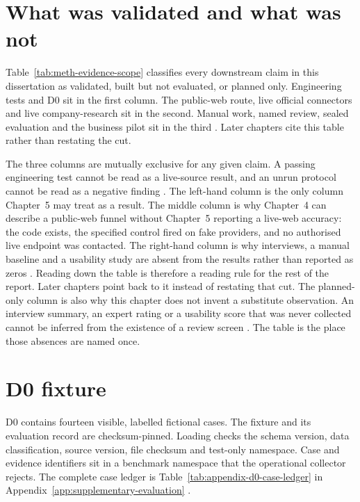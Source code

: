 \section{What was validated and what was not}
\label{sec:evidence-scope}

Table~\ref{tab:meth-evidence-scope} classifies every downstream claim in this dissertation as
validated, built but not evaluated, or planned only. Engineering tests and D0 sit in the first
column. The public-web route, live official connectors and live company-research sit in the second.
Manual work, named review, sealed evaluation and the business pilot sit in the third
\citep{hevner2004design,pineau2021reproducibility}. Later chapters cite this table rather than
restating the cut.



The three columns are mutually exclusive for any given claim. A passing engineering test cannot be
read as a live-source result, and an unrun protocol cannot be read as a negative finding
\citep{hevner2004design,pineau2021reproducibility}. The left-hand column is the only column
Chapter~5 may treat as a result. The middle column is why Chapter~4 can describe a public-web
funnel without Chapter~5 reporting a live-web accuracy: the code exists, the specified control
fired on fake providers, and no authorised live endpoint was contacted. The right-hand column is
why interviews, a manual baseline and a usability study are absent from the results rather than
reported as zeros \citep{kapoor2023leakage,fu2026agents}. Reading down the table is therefore a
reading rule for the rest of the report. Later chapters point back to it instead of restating
that cut. The planned-only column is also why this chapter does not invent a substitute
observation. An interview summary, an expert rating or a usability score that was never
collected cannot be inferred from the existence of a review screen
\citep{amershi2019guidelines,bucinca2021forcing}. The table is the place those absences are
named once.

\section{D0 fixture}

D0 contains fourteen visible, labelled fictional cases. The fixture and its evaluation record are
checksum-pinned. Loading checks the schema version, data classification, source version, file
checksum and test-only namespace. Case and evidence identifiers sit in a benchmark namespace that
the operational collector rejects. The complete case ledger is
Table~\ref{tab:appendix-d0-case-ledger} in Appendix~\ref{app:supplementary-evaluation}
\citep{gebru2021datasheets,pineau2021reproducibility}.

